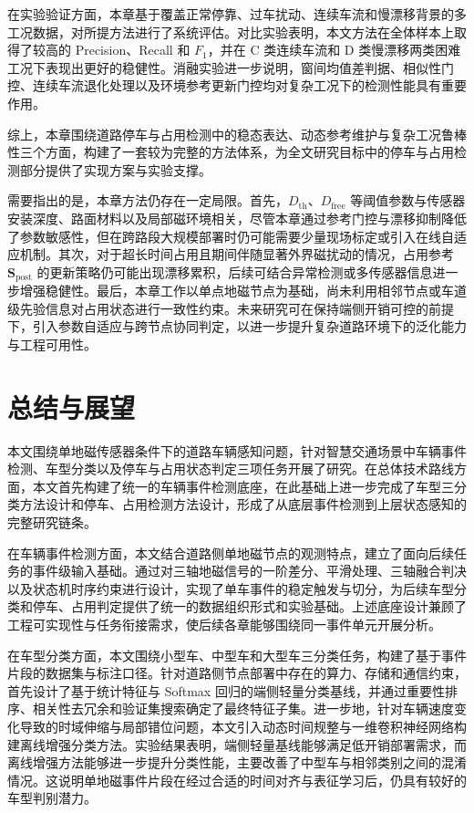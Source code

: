 \documentclass{xdupgthesis}
\begin{document}
在实验验证方面，本章基于覆盖正常停靠、过车扰动、连续车流和慢漂移背景的多工况数据，对所提方法进行了系统评估。对比实验表明，本文方法在全体样本上取得了较高的 Precision、Recall 和 $F_1$，并在 C 类连续车流和 D 类慢漂移两类困难工况下表现出更好的稳健性。消融实验进一步说明，窗间均值差判据、相似性门控、连续车流退化处理以及环境参考更新门控均对复杂工况下的检测性能具有重要作用。

综上，本章围绕道路停车与占用检测中的稳态表达、动态参考维护与复杂工况鲁棒性三个方面，构建了一套较为完整的方法体系，为全文研究目标中的停车与占用检测部分提供了实现方案与实验支撑。

需要指出的是，本章方法仍存在一定局限。首先，$D_{\mathrm{th}}$、$D_{\mathrm{free}}$ 等阈值参数与传感器安装深度、路面材料以及局部磁环境相关，尽管本章通过参考门控与漂移抑制降低了参数敏感性，但在跨路段大规模部署时仍可能需要少量现场标定或引入在线自适应机制。其次，对于超长时间占用且期间伴随显著外界磁扰动的情况，占用参考 $\mathbf{S}_{\mathrm{post}}$ 的更新策略仍可能出现漂移累积，后续可结合异常检测或多传感器信息进一步增强稳健性。最后，本章工作以单点地磁节点为基础，尚未利用相邻节点或车道级先验信息对占用状态进行一致性约束。未来研究可在保持端侧开销可控的前提下，引入参数自适应与跨节点协同判定，以进一步提升复杂道路环境下的泛化能力与工程可用性。




\chapter{总结与展望}

本文围绕单地磁传感器条件下的道路车辆感知问题，针对智慧交通场景中车辆事件检测、车型分类以及停车与占用状态判定三项任务开展了研究。在总体技术路线方面，本文首先构建了统一的车辆事件检测底座，在此基础上进一步完成了车型三分类方法设计和停车、占用检测方法设计，形成了从底层事件检测到上层状态感知的完整研究链条。

在车辆事件检测方面，本文结合道路侧单地磁节点的观测特点，建立了面向后续任务的事件级输入基础。通过对三轴地磁信号的一阶差分、平滑处理、三轴融合判决以及状态机时序约束进行设计，实现了单车事件的稳定触发与切分，为后续车型分类和停车、占用判定提供了统一的数据组织形式和实验基础。上述底座设计兼顾了工程可实现性与任务衔接需求，使后续各章能够围绕同一事件单元开展分析。

在车型分类方面，本文围绕小型车、中型车和大型车三分类任务，构建了基于事件片段的数据集与标注口径。针对道路侧节点部署中存在的算力、存储和通信约束，首先设计了基于统计特征与 Softmax 回归的端侧轻量分类基线，并通过重要性排序、相关性去冗余和验证集搜索确定了最终特征子集。进一步地，针对车辆速度变化导致的时域伸缩与局部错位问题，本文引入动态时间规整与一维卷积神经网络构建离线增强分类方法。实验结果表明，端侧轻量基线能够满足低开销部署需求，而离线增强方法能够进一步提升分类性能，主要改善了中型车与相邻类别之间的混淆情况。这说明单地磁事件片段在经过合适的时间对齐与表征学习后，仍具有较好的车型判别潜力。
\end{document}
